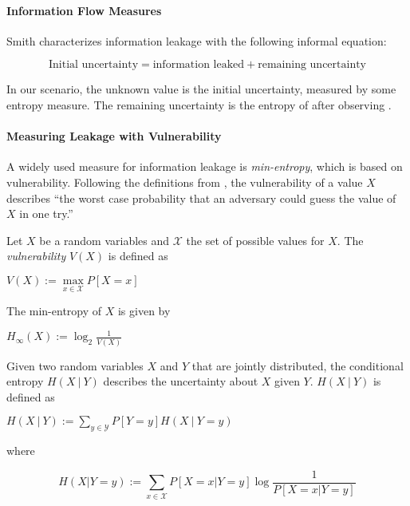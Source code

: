 \paragraph{Information Flow Measures}\label{ch:measures}

Smith \cite{smith09} characterizes information leakage with the following informal equation:
\begin{center}
    \begin{equation}
        \text{Initial uncertainty} = \text{information leaked} + \text{remaining uncertainty}
    \end{equation}\label{eq:measure}
\end{center}
In our scenario, the unknown value \In is the initial uncertainty, measured by some entropy measure. The remaining uncertainty is the entropy of \In after observing \Out.

\paragraph*{Measuring Leakage with Vulnerability}
A widely used measure for information leakage is \emph{min-entropy}, which is based on vulnerability. Following the definitions from \cite{smith09}, the vulnerability of a value $X$ describes \enquote{the worst case probability that an adversary could guess the value of $X$ in one try.}

\begin{definition}\label{def:vul}
    Let $X$ be a random variables and $\mathcal{X}$ the set of possible values for $X$. The \emph{vulnerability} $V(X)$ is defined as
    \begin{center}
        $V(X) := \max\limits_{x \in \mathcal{X}} P[X = x]$
    \end{center}
    The min-entropy of $X$ is given by
    \begin{center}
        $H_\infty (X) := \log_2 \frac{1}{V(X)}$
    \end{center}
\end{definition}

\begin{definition}
    Given two random variables $X$ and $Y$ that are jointly distributed, the conditional entropy $H(X \: | \: Y)$ describes the uncertainty about $X$ given $Y$. $H(X \: | \: Y)$ is defined as 
    \begin{center}
        $H(X \: | \: Y) := \sum\limits_{y \in \mathcal{Y}} P[Y = y] H(X \: | \: Y = y)$
    \end{center}
    where
    \begin{center}
        \begin{equation}\label{eq:dynEntropy}
        H(X | Y = y) := \sum\limits_{x \in \mathcal{X}} P[X = x | Y = y] \log \frac{1}{P[X = x | Y = y]}
    \end{equation}
    \end{center}
    
\end{definition}

